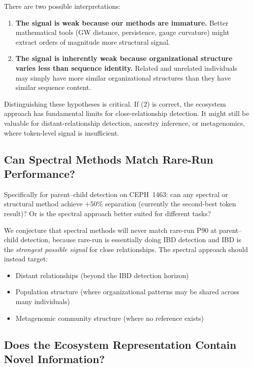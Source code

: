 \documentclass{../yalumba}
\begin{document}
There are two possible interpretations:

\begin{enumerate}
  \item \textbf{The signal is weak because our methods are immature.}
    Better mathematical tools (GW distance, persistence, gauge
    curvature) might extract orders of magnitude more structural
    signal.
  \item \textbf{The signal is inherently weak because organizational
    structure varies less than sequence identity.}  Related and
    unrelated individuals may simply have more similar organizational
    structures than they have similar sequence content.
\end{enumerate}

Distinguishing these hypotheses is critical.  If (2) is correct, the
ecosystem approach has fundamental limits for close-relationship
detection.  It might still be valuable for distant-relationship
detection, ancestry inference, or metagenomics, where token-level
signal is insufficient.

\subsection{Can Spectral Methods Match Rare-Run Performance?}
\label{sec:open:match}

Specifically for parent--child detection on CEPH~1463: can any spectral
or structural method achieve $+50\%$ separation (currently the
second-best token result)?  Or is the spectral approach better suited
for different tasks?

We conjecture that spectral methods will never match rare-run P90 at
parent--child detection, because rare-run is essentially doing IBD
detection and IBD is the \emph{strongest possible signal} for close
relationships.  The spectral approach should instead target:

\begin{itemize}
  \item Distant relationships (beyond the IBD detection horizon)
  \item Population structure (where organizational patterns may be
    shared across many individuals)
  \item Metagenomic community structure (where no reference exists)
\end{itemize}

\subsection{Does the Ecosystem Representation Contain Novel Information?}
\label{sec:open:novel}
\end{document}
